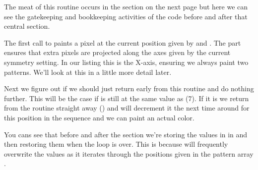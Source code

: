 The meat of this routine occurs in the  section on the next page but here we can see the
gatekeeping and bookkeeping activities of the code before and after that central section. 

The first call to  paints a pixel at the current position given by 
 and . The  part ensures that extra
pixels are projected along the axes given by the current symmetry setting. In our listing this is the
X-axis, ensuring we always paint two patterns. We'll look at this in a little more detail later.

Next we figure out if we should just return early from this routine and do nothing further. This will be the
case if  is still at the same value as  (7). If it is
we return from the routine straight away () and
 will decrement it the next time around for this position
in the sequence and we can paint an actual color.

You cans see that before and after the  section we're storing the values in  in
 and then restoring them when the loop is over. This is because 
will frequently overwrite the values as it iterates through the positions given in the pattern array .


